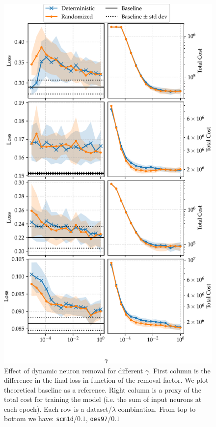 \begin{figure}
\begin{center}
\includegraphics[width=\columnwidth]{neuron_removal}
\vspace*{-5mm}
\caption{\label{neuron_removal_figure}Effect of dynamic neuron removal for different $\gamma$. First column is the difference in the final loss in function of the removal factor. We plot theoretical baseline as a reference. Right column is a proxy of the total cost for training the model (i.e. the sum of input neurons at each epoch). Each row is a dataset/$\lambda$ combination. From top to bottom we have: \texttt{scm1d}/$0.1$, \texttt{oes97}/$0.1$}

\end{center}
\vspace*{-4mm}
\end{figure}

